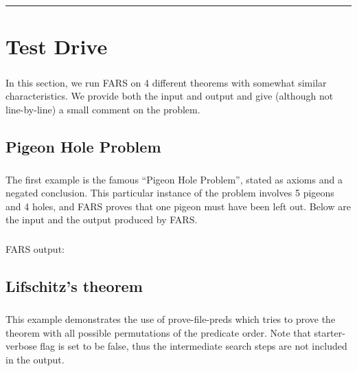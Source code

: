 \documentclass[11pt]{report}
\begin{document}
\hrule

\chapter{Test Drive}

\paragraph{} In this section, we run FARS on 4 different theorems with somewhat similar characteristics. We provide both the input and output and give (although not line-by-line) a small comment on the problem.

\section{Pigeon Hole Problem}

\paragraph{} The first example is the famous ``Pigeon Hole Problem'', stated as axioms and a negated conclusion. This particular instance of the problem involves 5 pigeons and 4 holes, and FARS proves that one pigeon must have been left out. Below are the input and the output produced by FARS.

\lstset{
xleftmargin=-55pt
}



\paragraph{} FARS output:




\section{Lifschitz's theorem}

\paragraph{} This example demonstrates the use of prove-file-preds which tries to prove the theorem with all possible permutations of the predicate order. Note that starter-verbose flag is set to be false, thus the intermediate search steps are not included in the output.
\end{document}
